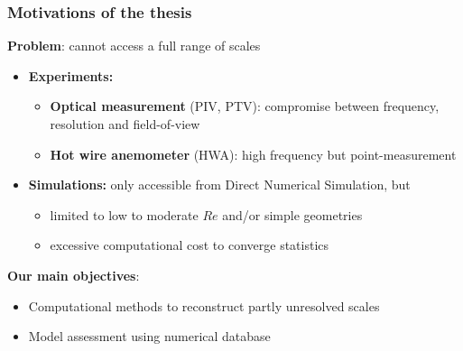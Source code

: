 \documentclass{beamer}
\let\olditem\item
\renewcommand{\item}{\setlength{\itemsep}{\fill}\olditem}
\begin{document}
\begin{frame}
\frametitle{Motivations of the thesis}
	\begin{block}{\textbf{Problem}: cannot access a full range of scales}
		\begin{itemize}
			\item \textbf{\color{red}Experiments:}
				\begin{itemize}
					\item \textbf{Optical measurement} (PIV, PTV): compromise between frequency, resolution and field-of-view
					\item \textbf{Hot wire anemometer} (HWA): high frequency but point-measurement
				\end{itemize}
			\item \textbf{\color{red}Simulations:} only accessible from Direct Numerical Simulation, but
				\begin{itemize}
					\item limited to low to moderate $ Re $ and/or simple geometries
					\item excessive computational cost to converge statistics
				\end{itemize}
		\end{itemize}
	\end{block}	
	\vfill
	\begin{block}{\textbf{Our main objectives}:}
		\begin{itemize}
			\item Computational methods to reconstruct partly unresolved scales
			\item Model assessment using numerical database
		\end{itemize}
	\end{block}	
\end{frame}
\end{document}
